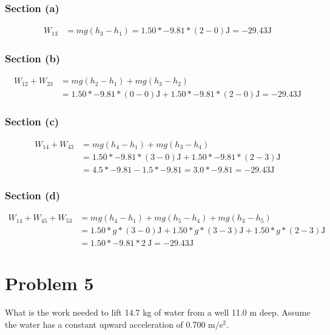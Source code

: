 \documentclass[12pt]{article}
\begin{document}
\subsubsection*{Section (a)}
\begin{align*}
    W_{13}  &= mg(h_3 - h_1) 
            = 1.50 * -9.81 * (2 - 0) \unit{\joule} 
            = \boxed{ -29.43\unit{\joule} }
\end{align*}

\subsubsection*{Section (b)}
\begin{align*}
    W_{12} + W_{23} &= mg(h_2 - h_1) + mg(h_3 - h_2)\\
        &= 1.50 * -9.81 * (0 - 0) \unit{\joule} + 1.50 * -9.81 * (2 - 0) \unit{\joule} 
        = \boxed{ -29.43\unit{\joule} }
\end{align*}

\subsubsection*{Section (c)}
\begin{align*}
    W_{14} + W_{43} &= mg(h_4 - h_1) + mg(h_3 - h_4)\\
        &= 1.50 * -9.81 * (3 - 0) \unit{\joule} + 1.50 * -9.81 * (2 - 3) \unit{\joule}\\
        &= 4.5 * -9.81 - 1.5 * -9.81 = 3.0 * -9.81 
        = \boxed{ -29.43\unit{\joule} }
\end{align*}

\subsubsection*{Section (d)}
\begin{align*}
    W_{14} + W_{45} + W_{53} &= mg(h_4 - h_1) + mg(h_5 - h_4) + mg(h_3 - h_5)\\
        &= 1.50 * g * (3 - 0) \unit{\joule} + 1.50 * g * (3 - 3) \unit{\joule} + 1.50 * g * (2 - 3) \unit{\joule}\\
        &= 1.50 * -9.81 * 2\ \unit{\joule} = \boxed{ -29.43\unit{\joule} }
\end{align*}


\pagebreak
\section*{Problem 5}
What is the work needed to lift 14.7 kg of water from a well 11.0 m deep. Assume the water has a constant upward acceleration of 0.700 m/s$^2$.
\end{document}
